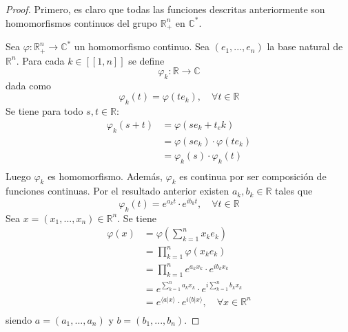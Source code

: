 \documentclass[12pt]{report}
\newcounter{it}
\theoremstyle{largebreak}
\newcommand\cf[3]{\ensuremath{#1:#2\rightarrow#3}}
\newcommand\pint[2]{\ensuremath{\langle#1| #2\rangle}}
\newcommand{\natint}[1]{\ensuremath{\left[\!\left[#1\right]\!\right]}}
\begin{document}
    \begin{proof}
        Primero, es claro que todas las funciones descritas anteriormente son homomorfismos continuos del grupo $\mathbb{R}^n_+$ en $\mathbb{C}^*$.

        Sea $\cf{\varphi}{\mathbb{R}^n_+}{\mathbb{C}^*}$ un homomorfismo continuo. Sea $(e_1,...,e_n)$ la base natural de $\mathbb{R}^n$. Para cada $k\in\natint{1,n}$ se define
        \begin{equation*}
            \cf{\varphi_k}{\mathbb{R}}{\mathbb{C}}
        \end{equation*}
        dada como
        \begin{equation*}
            \varphi_k(t)=\varphi(te_k),\quad\forall t\in\mathbb{R}
        \end{equation*}
        Se tiene para todo $s,t\in\mathbb{R}$:
        \begin{equation*}
            \begin{split}
                \varphi_k(s+t)&=\varphi(se_k+t_ek)\\
                &=\varphi(se_k)\cdot\varphi(te_k)\\
                &=\varphi_k(s)\cdot\varphi_k(t)\\
            \end{split}
        \end{equation*}
        Luego $\varphi_k$ es homomorfismo. Además, $\varphi_k$ es continua por ser composición de funciones continuas. Por el resultado anterior existen $a_k,b_k\in\mathbb{R}$ tales que
        \begin{equation*}
            \varphi_k(t)=e^{ a_kt}\cdot e^{ib_kt},\quad\forall t\in\mathbb{R}
        \end{equation*}
        Sea $x=(x_1,...,x_n)\in\mathbb{R}^n$. Se tiene
        \begin{equation*}
            \begin{split}
                \varphi(x)&=\varphi\left(\sum_{ k=1}^n x_ke_k \right)\\
                &=\prod_{ k=1}^n \varphi(x_ke_k)\\
                &=\prod_{ k=1}^n e^{ a_kx_k}\cdot e^{ib_kx_k}\\
                &=e^{\sum_{ k=1}^n a_kx_k}\cdot e^{i\sum_{ k=1}^n b_kx_k}\\
                &=e^{\pint{a}{x}}\cdot e^{i\pint{b}{x}},\quad\forall x\in\mathbb{R}^n \\
            \end{split}
        \end{equation*}
        siendo $a=(a_1,...,a_n)$ y $b=(b_1,...,b_n)$.
    \end{proof}
\end{document}

